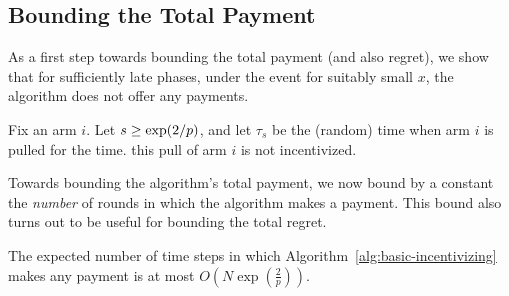 \subsection{Bounding the Total Payment}

As a first step towards bounding the total payment (and also regret),
we show that for sufficiently late phases,
under the event  for suitably small $x$,
the algorithm does not offer any payments.

\begin{lemma} \label{lem:no-incentives}
Fix an arm $i$.
Let $s \geq \exp(2/p)$, and let $\tau_s$ be the (random)
time when arm $i$ is pulled for the  time.
this pull of arm $i$ is not incentivized.
\end{lemma}

Towards bounding the algorithm's total payment, we now bound by a
constant the \emph{number} of rounds in which the algorithm makes a
payment.
This bound also turns out to be useful for bounding the total regret.

\begin{lemma} \label{lem:numP}
The expected number of time steps in which
Algorithm~\ref{alg:basic-incentivizing}
makes any payment is at most $O\left( N\exp\left(\frac{2}{p}\right) \right)$.
\end{lemma}

